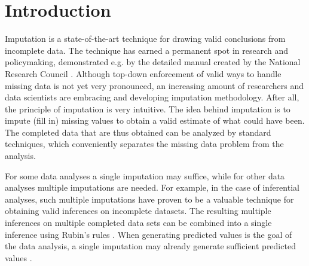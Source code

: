 \documentclass[bimj,fleqn]{w-art}
\begin{document}
\maketitle          %







\section{Introduction}

Imputation is a state-of-the-art technique for drawing valid conclusions from incomplete data. The technique has earned a permanent spot in research and policymaking, demonstrated e.g. by the detailed manual created by the National Research Council \citep*{little2012prevention}. Although top-down enforcement of valid ways to handle missing data is not yet very pronounced, an increasing amount of researchers and data scientists are embracing and developing imputation methodology. After all, the principle of imputation is very intuitive. The idea behind imputation is to impute (fill in) missing values to obtain a valid estimate of what could have been. The completed data that are thus obtained can be analyzed by standard techniques, which conveniently separates the missing data problem from the analysis. 

For some data analyses a single imputation may suffice, while for other data analyses multiple imputations are needed. For example, in the case of inferential analyses, such multiple imputations \citep{rubi76} have proven to be a valuable technique for obtaining valid inferences on incomplete datasets. The resulting multiple inferences on multiple completed data sets can be combined into a single inference using Rubin's rules \citep[][p. 76]{rubi87}. When generating predicted values is the goal of the data analysis, a single imputation may already generate sufficient predicted values \citep{nijm20}. 
\end{document}
